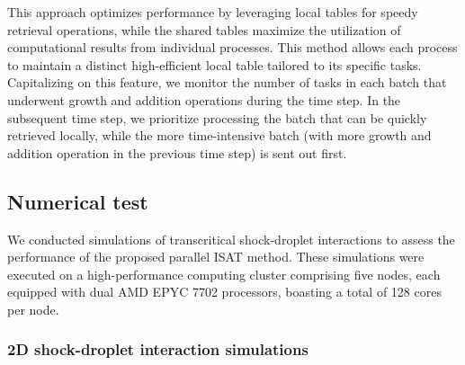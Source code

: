 This approach optimizes performance by leveraging local tables for speedy retrieval operations, while the shared tables maximize the utilization of computational results from individual processes. This method allows each process to maintain a distinct high-efficient local table tailored to its specific tasks. Capitalizing on this feature, we monitor the number of tasks in each batch that underwent growth and addition operations during the time step. In the subsequent time step, we prioritize processing the batch that can be quickly retrieved locally, while the more time-intensive batch (with more growth and addition operation in the previous time step) is sent out first.



\subsection{Numerical test}
We conducted simulations of transcritical shock-droplet interactions to assess the performance of the proposed parallel ISAT method. These simulations were executed on a high-performance computing cluster comprising five nodes, each equipped with dual AMD EPYC 7702 processors, boasting a total of 128 cores per node.
\subsubsection{2D shock-droplet interaction simulations}


